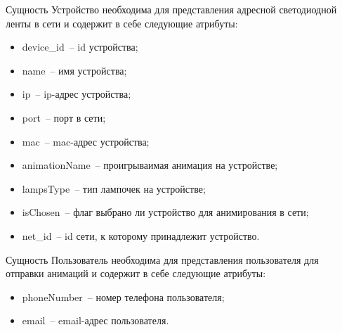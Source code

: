 Сущность Устройство необходима для представления адресной светодиодной ленты в сети и содержит в себе следующие атрибуты:
\begin{itemize}
	\item device\_id~-- id устройства;
	\item name~-- имя устройства;
	\item ip~-- ip-адрес устройства;
	\item port~-- порт в сети;
	\item mac~-- mac-адрес устройства;
	\item animationName~-- проигрываимая анимация на устройстве;
	\item lampsType~-- тип лампочек на устройстве;
	\item isChosen~-- флаг выбрано ли устройство для анимирования в сети;
	\item net\_id~-- id сети, к которому принадлежит устройство.
\end{itemize}

Сущность Пользователь необходима для представления пользователя для отправки анимаций и содержит в себе следующие атрибуты:
\begin{itemize}
	\item phoneNumber~-- номер телефона пользователя;
	\item email~-- email-адрес пользователя.
\end{itemize}